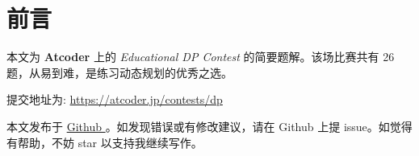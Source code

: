 \maketitle
\tableofcontents
\newpage
\section*{前言}

本文为 \textbf{Atcoder} 上的 \emph{Educational DP Contest} 的简要题解。该场比赛共有 26 题，从易到难，是练习动态规划的优秀之选。

提交地址为: \url{ https://atcoder.jp/contests/dp}

本文发布于 \href{https://github.com/SamZhangQingChuan/Editorials}{ Github }。如发现错误或有修改建议，请在 Github 上提 issue。如觉得有帮助，不妨 star 以支持我继续写作。

\newpage

